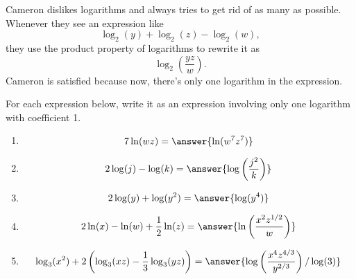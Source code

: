 \documentclass{ximera}
\author{Kenneth Berglund}
\begin{document}
Cameron dislikes logarithms and always tries to get rid of as many as possible. Whenever they see an expression like 
$$
\log_2(y) + \log_2(z) - \log_2(w),
$$
they use the product property of logarithms to rewrite it as 
$$
\log_2\left(\frac{yz}{w}\right). 
$$
Cameron is satisfied because now, there's only one logarithm in the expression.

\begin{exercise}
For each expression below, write it as an expression involving only one logarithm with coefficient 1.
\begin{enumerate}
\item 
$$
7\ln(wz) = \answer{\ln(w^7z^7)}
$$

\item 
$$
2\log(j) - \log(k) = \answer{\log\left(\frac{j^2}{k}\right)}
$$

\item
$$
2\log(y) + \log(y^2) = \answer{\log(y^4)}
$$

\item 
$$
2\ln(x) - \ln(w) + \frac{1}{2}\ln(z) = \answer{\ln\left(\frac{x^2z^{1/2}}{w}\right)}
$$



\item 
$$
\log_3(x^2) + 2\left(\log_3(xz) - \frac{1}{3}\log_3(yz)\right) = \answer{\log\left(\frac{x^4z^{4/3}}{y^{2/3}}\right)/\log(3)}
$$


\end{enumerate}


\end{exercise}
\end{document}
